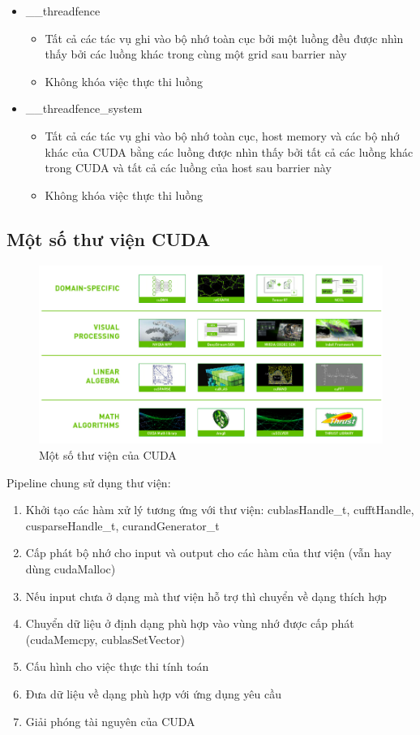 \documentclass[14pt, a4paper]{article}
\numberwithin{equation}{section}
\numberwithin{figure}{section}
\numberwithin{dl}{section}
\numberwithin{md}{section}
\numberwithin{bd}{section}
\numberwithin{dn}{section}
\numberwithin{hq}{section}
\begin{document}
\begin{itemize}
    \item \_\_threadfence
    \begin{itemize}
        \item Tất cả các tác vụ ghi vào bộ nhớ toàn cục bởi một luồng đều được nhìn thấy bởi các luồng khác trong cùng một grid sau barrier này
        \item Không khóa việc thực thi luồng
    \end{itemize}
    \item \_\_threadfence\_system
    \begin{itemize}
        \item Tất cả các tác vụ ghi vào bộ nhớ toàn cục, host memory và các bộ nhớ khác của CUDA bằng các luồng được nhìn thấy bởi tất cả các luồng khác trong CUDA và tất cả các luồng của host sau barrier này 
        \item Không khóa việc thực thi luồng
    \end{itemize}
\end{itemize}

\subsection{Một số thư viện CUDA}

\begin{figure}[H]
    \centering
    \includegraphics[width=0.8\linewidth]{figures/CUDA/CUDA_library.png}
    \caption{Một số thư viện của CUDA}
\end{figure}

Pipeline chung sử dụng thư viện:

\begin{enumerate}
    \item Khởi tạo các hàm xử lý tương ứng với thư viện:  cublasHandle\_t, cufftHandle,	
    cusparseHandle\_t, curandGenerator\_t
    \item Cấp phát bộ nhớ cho input và output cho các hàm của thư viện (vẫn hay dùng cudaMalloc)
    \item Nếu input chưa ở dạng mà thư viện hỗ trợ thì chuyển về dạng thích hợp
    \item Chuyển dữ liệu ở định dạng phù hợp vào vùng nhớ được cấp phát (cudaMemcpy, cublasSetVector)
    \item Cấu hình cho việc thực thi tính toán
    \item Đưa dữ liệu về dạng phù hợp với ứng dụng yêu cầu
    \item Giải phóng tài nguyên của CUDA
\end{enumerate}
\end{document}
